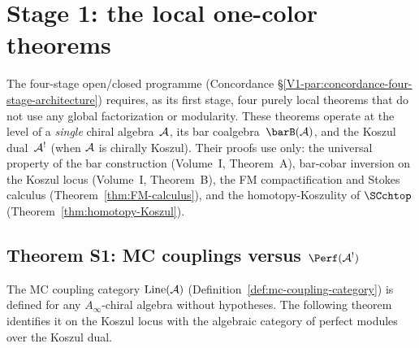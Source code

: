 \section{Stage 1: the local one-color theorems}
\label{sec:stage1-local-theorems}

The four-stage open/closed programme
(Concordance \S\ref{V1-par:concordance-four-stage-architecture})
requires, as its first stage, four purely local theorems that
do not use any global factorization or modularity.
These theorems operate at the level of a \emph{single} chiral
algebra~$\mathcal{A}$, its bar coalgebra~$\barB(\cA)$,
and the Koszul dual~$\mathcal{A}^!$ (when $\mathcal{A}$ is chirally Koszul).
Their proofs use only:
the universal property of the bar construction
(Volume~I, Theorem~A),
bar-cobar inversion on the Koszul locus
(Volume~I, Theorem~B),
the FM compactification and Stokes calculus
(Theorem~\ref{thm:FM-calculus}),
and the homotopy-Koszulity of $\SCchtop$
(Theorem~\ref{thm:homotopy-Koszul}).

\subsection{Theorem S1: MC couplings versus $\Perf(\cA^!)$}
\label{subsec:mc-couplings-perf}

The MC coupling category $\operatorname{Line}(\mathcal{A})$
(Definition~\ref{def:mc-coupling-category}) is defined for any
$A_\infty$-chiral algebra without hypotheses. The following
theorem identifies it on the Koszul locus with the algebraic
category of perfect modules over the Koszul dual.

